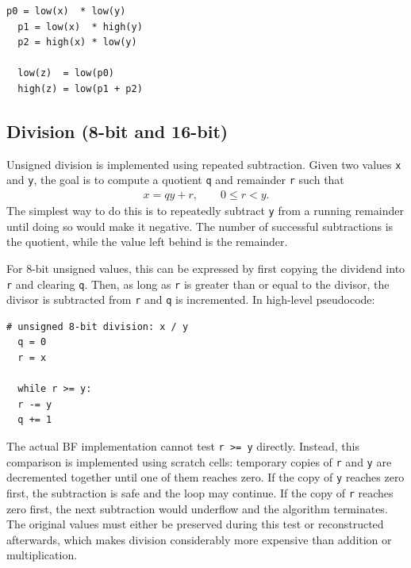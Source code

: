 \vspace{0.5cm}\noindent\begin{minipage}{\linewidth}
\begin{lstlisting}[style=pseudocode]
  p0 = low(x)  * low(y)
  p1 = low(x)  * high(y)
  p2 = high(x) * low(y)

  low(z)  = low(p0)
  high(z) = low(p1 + p2) 
\end{lstlisting}
\end{minipage}


\subsection{Division (8-bit and 16-bit)}
Unsigned division is implemented using repeated subtraction. Given two values \texttt{x} and \texttt{y}, the goal is to compute a quotient \texttt{q} and remainder \texttt{r} such that
%
\begin{align}
x = qy + r, \qquad 0 \leq r < y.
\end{align}
%
The simplest way to do this is to repeatedly subtract \texttt{y} from a running remainder until doing so would make it negative. The number of successful subtractions is the quotient, while the value left behind is the remainder.

For 8-bit unsigned values, this can be expressed by first copying the dividend into \texttt{r} and clearing \texttt{q}. Then, as long as \texttt{r} is greater than or equal to the divisor, the divisor is subtracted from \texttt{r} and \texttt{q} is incremented. In high-level pseudocode:

\vspace{0.5cm}\noindent\begin{minipage}{\linewidth}
\begin{lstlisting}[style=pseudocode]
  # unsigned 8-bit division: x / y
  q = 0
  r = x

  while r >= y:
  r -= y
  q += 1
\end{lstlisting}
\end{minipage}

The actual BF implementation cannot test \texttt{r >= y} directly. Instead, this comparison is implemented using scratch cells: temporary copies of \texttt{r} and \texttt{y} are decremented together until one of them reaches zero. If the copy of \texttt{y} reaches zero first, the subtraction is safe and the loop may continue. If the copy of \texttt{r} reaches zero first, the next subtraction would underflow and the algorithm terminates. The original values must either be preserved during this test or reconstructed afterwards, which makes division considerably more expensive than addition or multiplication.

